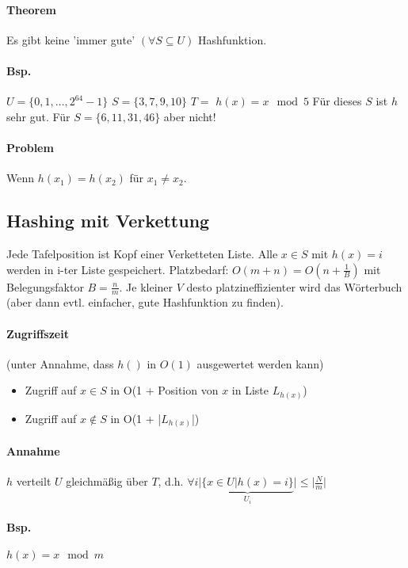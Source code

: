 \paragraph*{Theorem} Es gibt keine 'immer gute' $(\forall S \subseteq U)$ Hashfunktion.

\paragraph*{Bsp.} $U=\{ 0,1,\dots,2^{64}-1 \}$ $S=\{ 3,7,9,10 \}$ $T=$ %
$h(x) = x \mod 5$ Für dieses $S$ ist $h$ sehr gut. Für $S=\{ 6,11,31,46 \}$ aber nicht!

\paragraph*{Problem} Wenn $h(x_1)=h(x_2)$ für $x_1 \not= x_2$.


\subsection{Hashing mit Verkettung}
Jede Tafelposition ist Kopf einer Verketteten Liste. Alle $x \in S$ mit $h(x)=i$ werden in i-ter Liste gespeichert. Platzbedarf: $O(m+n) = O(n+\frac{1}{B})$ mit Belegungsfaktor $B=\frac{n}{m}$. %
Je kleiner $V$ desto platzineffizienter wird das Wörterbuch (aber dann evtl. einfacher, gute Hashfunktion zu finden).

\paragraph*{Zugriffszeit} (unter Annahme, dass $h()$ in $O(1)$ ausgewertet werden kann)
\begin{itemize}
	\item[] Zugriff auf $x \in S$ in O(1 + Position von $x$ in Liste $L_{h(x)}$)
	\item[] Zugriff auf $x \not\in S$ in O(1 + |$L_{h(x)}$|)
\end{itemize}

\paragraph*{Annahme} $h$ verteilt $U$ gleichmäßig über $T$, d.h. $\forall i \big|\underbrace{\{ x \in U | h(x)=i \}}_{U_i}\big| \leq \big|\frac{N}{m}\big|$

\paragraph*{Bsp.} $h(x) = x \mod m$

